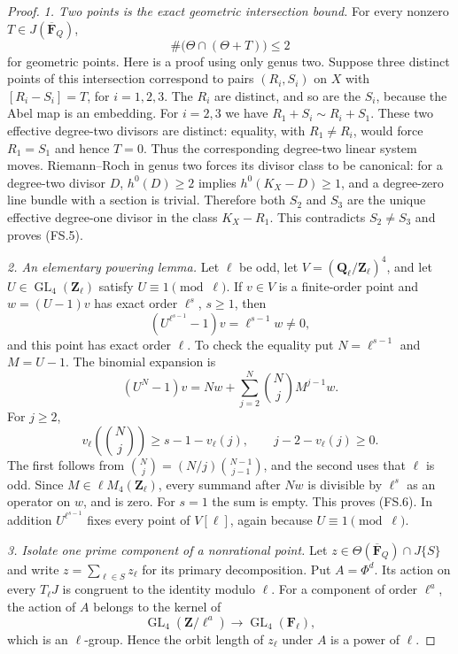 \begin{proof}
\emph{1. Two points is the exact geometric intersection bound.}
For every nonzero $T\in J(\overline{\mathbf F}_Q)$,
\[
                  \#\bigl(\Theta\cap(\Theta+T)\bigr)\le2
                                                               \tag{FS.5}
\]
for geometric points. Here is a proof using only genus two.
Suppose three distinct points of this intersection correspond to
pairs $(R_i,S_i)$ on $X$ with
$[R_i-S_i]=T$, for $i=1,2,3$. The $R_i$ are distinct, and so
are the $S_i$, because the Abel map is an embedding.
For $i=2,3$ we have
$R_1+S_i\sim R_i+S_1$. These two effective degree-two divisors
are distinct: equality, with $R_1\ne R_i$, would force
$R_1=S_1$ and hence $T=0$.
Thus the corresponding degree-two linear system moves.
Riemann--Roch in genus two forces its divisor class to be
canonical: for a degree-two divisor $D$, $h^0(D)\ge2$ implies
$h^0(K_X-D)\ge1$, and a degree-zero line bundle with a section
is trivial. Therefore both $S_2$ and $S_3$ are the unique
effective degree-one divisor in the class $K_X-R_1$.
This contradicts $S_2\ne S_3$ and proves (FS.5).

\emph{2. An elementary powering lemma.}
Let $\ell$ be odd, let $V=(\mathbf Q_\ell/\mathbf Z_\ell)^4$,
and let $U\in\operatorname{GL}_4(\mathbf Z_\ell)$ satisfy
$U\equiv1\pmod\ell$. If $v\in V$ is a finite-order point and
$w=(U-1)v$ has exact order $\ell^s$, $s\ge1$, then
\[
        (U^{\ell^{s-1}}-1)v=\ell^{s-1}w\ne0,
                                                               \tag{FS.6}
\]
and this point has exact order $\ell$.
To check the equality put $N=\ell^{s-1}$ and $M=U-1$.
The binomial expansion is
\[
 (U^N-1)v=Nw+\sum_{j=2}^{N}\binom Nj M^{j-1}w.
\]
For $j\ge2$,
\[
 v_\ell\!\left(\binom Nj\right)\ge s-1-v_\ell(j),
 \qquad j-2-v_\ell(j)\ge0.
\]
The first follows from
$\binom Nj=(N/j)\binom{N-1}{j-1}$, and the second uses that
$\ell$ is odd. Since $M\in\ell M_4(\mathbf Z_\ell)$, every
summand after $Nw$ is divisible by $\ell^s$ as an operator on
$w$, and is zero. For $s=1$ the sum is empty. This proves
(FS.6). In addition $U^{\ell^{s-1}}$ fixes every point of
$V[\ell]$, again because $U\equiv1\pmod\ell$.

\emph{3. Isolate one prime component of a nonrational point.}
Let $z\in\Theta(\overline{\mathbf F}_Q)\cap J\{S\}$ and
write $z=\sum_{\ell\in S}z_\ell$ for its primary decomposition.
Put $A=\Phi^d$. Its action on every $T_\ell J$ is congruent
to the identity modulo $\ell$. For a component of order
$\ell^a$, the action of $A$ belongs to the kernel of
\[
 \operatorname{GL}_4(\mathbf Z/\ell^a)
                         \longrightarrow\operatorname{GL}_4(\mathbf F_\ell),
\]
which is an $\ell$-group. Hence the orbit length of $z_\ell$
under $A$ is a power of $\ell$.


\end{proof}
